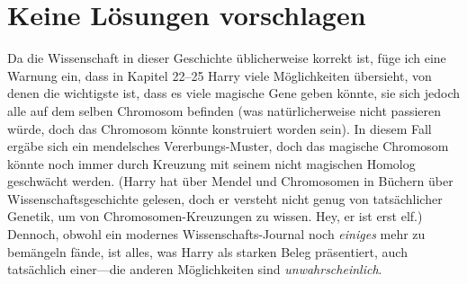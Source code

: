 \chapter{Keine Lösungen vorschlagen}

\begin{chapterOpeningAuthorNote}
Da die Wissenschaft in dieser Geschichte üblicherweise korrekt ist, füge ich eine Warnung ein, dass in Kapitel 22–25 Harry viele Möglichkeiten übersieht, von denen die wichtigste ist, dass es viele magische Gene geben könnte, sie sich jedoch alle auf dem selben Chromosom befinden (was natürlicherweise nicht passieren würde, doch das Chromosom könnte konstruiert worden sein). In diesem Fall ergäbe sich ein mendelsches Vererbungs-Muster, doch das magische Chromosom könnte noch immer durch Kreuzung mit seinem nicht magischen Homolog geschwächt werden. (Harry hat über Mendel und Chromosomen in Büchern über Wissenschaftsgeschichte gelesen, doch er versteht nicht genug von tatsächlicher Genetik, um von Chromosomen-Kreuzungen zu wissen. Hey, er ist erst elf.) Dennoch, obwohl ein modernes Wissenschafts-Journal noch \emph{einiges} mehr zu bemängeln fände, ist alles, was Harry als starken Beleg präsentiert, auch tatsächlich einer—die anderen Möglichkeiten sind \emph{unwahrscheinlich}.%
\end{chapterOpeningAuthorNote}

